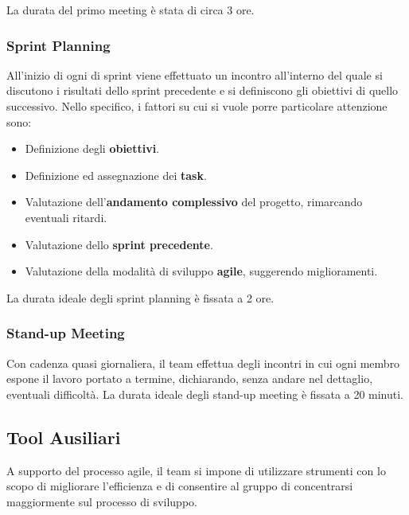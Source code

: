 La durata del primo meeting è stata di circa 3 ore.

\subsubsection{Sprint Planning}
All'inizio di ogni di sprint viene effettuato un incontro all'interno del quale si discutono i risultati dello sprint precedente e si definiscono gli obiettivi di quello successivo. Nello specifico, i fattori su cui si vuole porre particolare attenzione sono:
\begin{itemize}
    \item Definizione degli \textbf{obiettivi}.
    \item Definizione ed assegnazione dei \textbf{task}.
    \item Valutazione dell'\textbf{andamento complessivo} del progetto, rimarcando eventuali ritardi.
    \item Valutazione dello \textbf{sprint precedente}.
    \item Valutazione della modalità di sviluppo \textbf{agile}, suggerendo miglioramenti.
\end{itemize}
La durata ideale degli sprint planning è fissata a 2 ore.

\subsubsection{Stand-up Meeting}
Con cadenza quasi giornaliera, il team effettua degli incontri in cui ogni membro espone il lavoro portato a termine, dichiarando, senza andare nel dettaglio, eventuali difficoltà. La durata ideale degli stand-up meeting è fissata a 20 minuti.

\subsection{Tool Ausiliari}
A supporto del processo agile, il team si impone di utilizzare strumenti con lo scopo di migliorare l’efficienza e di consentire al gruppo di concentrarsi maggiormente sul processo di sviluppo.

